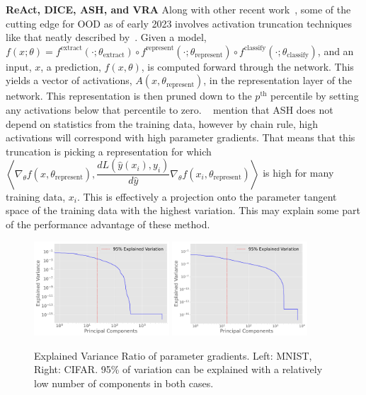 \textbf{ReAct, DICE, ASH, and VRA}
Along with other recent work~\citep{sun2021, sun2022, xu2023vra}, some of the cutting edge for OOD as of early 2023 involves activation truncation techniques like that neatly described by~\citet{djurisic2023extremely}. Given a model, $f(x; \theta) = f^{\text{extract}}(\cdot; \theta_{\text{extract}}) \circ f^{\text{represent}}(\cdot; \theta_{\text{represent}}) \circ f^{\text{classify}}(\cdot; \theta_{\text{classify}})$, and an input, $x$, a prediction, $f(x, \theta)$, is computed forward through the network. This yields a vector of activations, $A(x, \theta_{\text{represent}})$, in the representation layer of the network. This representation is then pruned down to the $p^{\text{th}}$ percentile by setting any activations below that percentile to zero. ~\citet{djurisic2023extremely} mention that ASH does not depend on statistics from the training data, however by chain rule, high activations will correspond with high parameter gradients. That means that this truncation is picking a representation for which $\left\langle \nabla_\theta f(x, \theta_{\text{represent}}), \dfrac{dL(\hat y(x_i), y_i)}{d\hat y} \nabla_\theta f(x_i, \theta_{\text{represent}}) \right\rangle$ is high for many training data, $x_i$. This is effectively a projection onto the parameter tangent space of the training data with the highest variation. This may explain some part of the performance advantage of these method. 

\begin{figure}[t]
    \centering
    \includegraphics[width=0.45\textwidth]{c4a_figures/explained_variance_ratio.pdf}
    \includegraphics[width=0.45\textwidth]{c4a_figures/explained_variance_ratio_cifar.pdf}
    \caption{Explained Variance Ratio of parameter gradients. Left: MNIST, Right: CIFAR. 95\% of variation can be explained with a relatively low number of components in both cases.}
    \label{fig:rank}
\end{figure}

